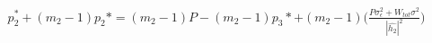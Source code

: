 \documentclass[preview]{standalone}
\begin{document}
\begin{align*}
p_2^\ast + \left(m_2 - 1\right) p_2\ast = \left(m_2 - 1\right) P - \left(m_2 - 1\right) p_3\ast + \left(m_2 - 1\right) \Bigg( \frac{P \sigma_\epsilon^2 + W_{tot} \sigma^2}{\left|\hat{h_2}\right|^2} \Bigg)
\end{align*}
\end{document}
